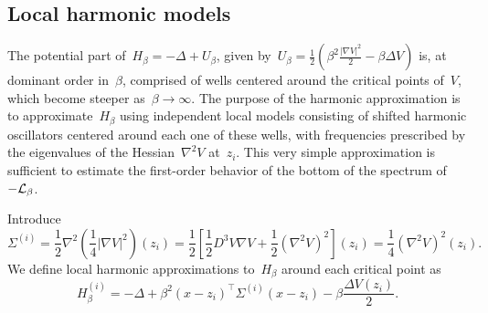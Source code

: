     \subsection{Local harmonic models}\label{02:subsec:local_oscillators}
    The potential part of~$H_\beta = - \Delta + U_\beta $, given by~$U_\beta=\frac12\left(\beta^2\frac{|\nabla V|^2}2-\beta\Delta V\right)$ is, at dominant order in~$\beta$, comprised of wells centered around the critical points of~$V$, which become steeper as~$\beta\to\infty$. 
    The purpose of the harmonic approximation is to approximate~$H_\beta$ using independent local models consisting of shifted harmonic oscillators centered around each one of these wells, with frequencies prescribed by the eigenvalues of the Hessian~$\nabla^2 V$ at~$z_i$.
    This very simple approximation is sufficient to estimate the first-order behavior of the bottom of the spectrum of~$-\mathcal{L}_\beta$.

    Introduce
    \[\Sigma^{(i)} = \frac12\nabla^2 \left(\frac14|\nabla V|^2\right)(z_i)  = \frac12\left[\frac12 D^3 V \nabla V + \frac12 \left( \nabla^2 V\right)^2 \right](z_i) = \frac14 \left(\nabla^2 V\right)^2(z_i).\]
    We define local harmonic approximations to~$H_\beta$ around each critical point as
    \begin{equation}
        \label{02:eq:local_harmonic_approx}
        H_\beta^{(i)} = -\Delta + \beta^2 (x-z_i)^\intercal \Sigma^{(i)}(x-z_i) - \beta \frac{\Delta V(z_i)}2.
    \end{equation}

